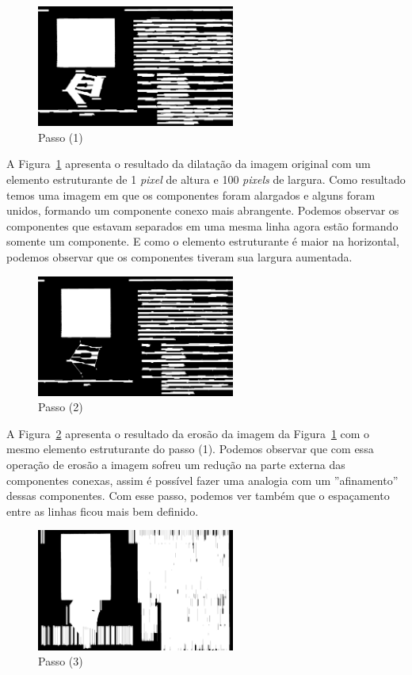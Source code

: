 \documentclass[twoside,twocolumn]{article}
\begin{document}
\begin{figure}[H]
\begin{center}
	\includegraphics[height=4cm]{figures/step_1.png}
\caption{Passo (1)} \label{step_1}
\end{center}
\end{figure}

A Figura~\ref{step_1} apresenta o resultado da dilatação da imagem original com um elemento estruturante de 1 \textit{pixel} de altura e 100 \textit{pixels} de largura. Como resultado temos uma imagem em que os componentes foram alargados e alguns foram unidos, formando um componente conexo mais abrangente. Podemos observar os componentes que estavam separados em uma mesma linha agora estão formando somente um componente. E como o elemento estruturante é maior na horizontal, podemos observar que os componentes tiveram sua largura aumentada.

\begin{figure}[H]
\begin{center}
	\includegraphics[height=4cm]{figures/step_2.png}
\caption{Passo (2)} \label{step_2}
\end{center}
\end{figure}

A Figura~\ref{step_2} apresenta o resultado da erosão da imagem da Figura~\ref{step_1} com o mesmo elemento estruturante do passo (1). Podemos observar que com essa operação de erosão a imagem sofreu um redução na parte externa das componentes conexas, assim é possível fazer uma analogia com um ''afinamento'' dessas componentes. Com esse passo, podemos ver também que o espaçamento entre as linhas ficou mais bem definido.

\begin{figure}[H]
\begin{center}
	\includegraphics[height=4cm]{figures/step_3.png}
\caption{Passo (3)} \label{step_3}
\end{center}
\end{figure}
\end{document}
